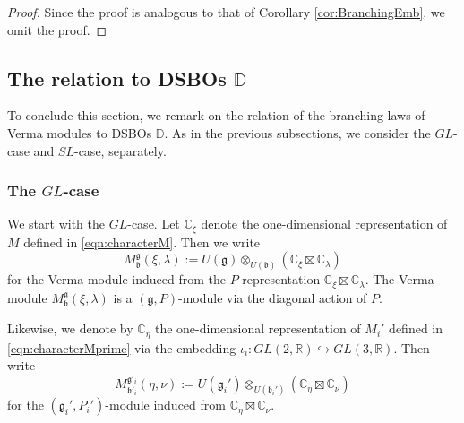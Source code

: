 \documentclass[a4paper,11pt,reqno]{amsart}
\newcommand{\frakg}{\mathfrak{g}}
\newcommand{\DD}{\mathbb{D}}
\newcommand{\0}{{\bf 0}}
\newcommand{\R}{\mathbb{R}}
\newcommand{\C}{\mathbb{C}}
\newcommand{\1}{{\bf 1}}
\newcommand{\frakb}{{\mathfrak b}}
\newcommand{\Mb}{M^{\frakg}_{\frakb}}
\theoremstyle{plain}
\theoremstyle{definition}
\numberwithin{equation}{section}
\theoremstyle{definition}
\begin{document}
\begin{proof}
Since the proof is analogous to that of Corollary \ref{cor:BranchingEmb},
we omit the proof.
\end{proof}

\subsection{The relation to DSBOs \texorpdfstring{$\DD$}{D}}
\label{sec:BranchingDSBO}

To conclude this section, we remark on 
the relation of the branching laws of 
Verma modules to DSBOs $\DD$.
As in the previous subsections, we consider the $GL$-case and 
$SL$-case, separately.

\subsubsection{The \texorpdfstring{$GL$}{GL}-case}
\label{sec:BranchingDSBO_GL}

We start with the $GL$-case.
Let $\C_{\xi}$ denote the one-dimensional representation of $M$
defined in \eqref{eqn:characterM}. 
Then we write 
\begin{equation*}
\Mb(\xi, \lambda):=U(\frakg)\otimes_{U(\frakb)}(\C_{\xi}\boxtimes \C_{\lambda})
\end{equation*}
for the Verma module induced from the $P$-representation 
$\C_{\xi}\boxtimes \C_{\lambda}$. 
The Verma module $\Mb(\xi, \lambda)$ is a $(\frakg, P)$-module
via the diagonal action of $P$.

Likewise, we denote by
$\C_{\eta}$ the one-dimensional representation of $M_i'$ 
defined in \eqref{eqn:characterMprime} via the embedding
$\iota_i \colon GL(2,\R) \hookrightarrow GL(3,\R)$.
Then write
\begin{equation*}
M^{\frakg'_i}_{\frakb'_i}(\eta,\nu)
:=U(\frakg_i')\otimes_{U(\frakb_i')}(\C_{\eta}\boxtimes \C_{\nu})
\end{equation*}
for the  $(\frakg_i', P_i')$-module induced from 
$\C_{\eta}\boxtimes \C_{\nu}$.
\end{document}

